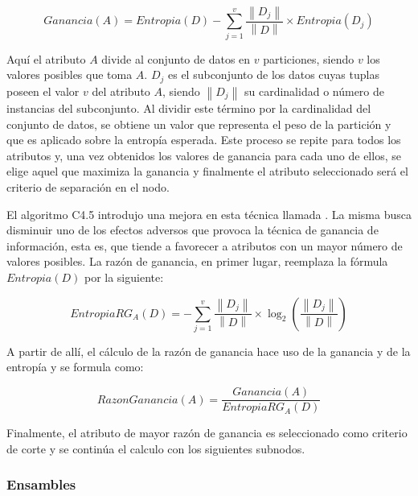 \begin{equation}
   Ganancia(A) = Entropia(D) 
   - \sum_{j=1}^{v} \frac{\left\| D_{j} \right\|}{\left\| D \right\|} 
   \times Entropia(D_{j})
\end{equation}

Aquí el atributo $A$ divide al conjunto de datos en $v$ particiones, siendo $v$
los valores posibles que toma $A$. $D_{j}$ es el subconjunto de los datos cuyas
tuplas poseen el valor $v$ del atributo $A$, siendo $\left\|D_{j}\right\|$ su
cardinalidad o número de instancias del subconjunto. Al dividir este término por
la cardinalidad del conjunto de datos, se obtiene un valor que representa el
peso de la partición y que es aplicado sobre la entropía esperada. Este proceso
se repite para todos los atributos y, una vez obtenidos los valores de ganancia
para cada uno de ellos, se elige aquel que maximiza la ganancia y finalmente el
atributo seleccionado será el criterio de separación en el nodo.

El algoritmo C4.5 introdujo una mejora en esta técnica llamada . La misma busca disminuir uno de los efectos adversos que provoca
la técnica de ganancia de información, esta es, que tiende a favorecer a
atributos con un mayor número de valores posibles. La razón de ganancia, en
primer lugar, reemplaza la fórmula $Entropia(D)$ por la siguiente:

\begin{equation}
   EntropiaRG_{A}(D) = - \sum_{j=1}^{v} \frac{\left\| D_{j} \right\|}{\left\| D \right\|} 
   \times \log_{2}(\frac{\left\| D_{j} \right\|}{\left\| D \right\|})
\end{equation}

A partir de allí, el cálculo de la razón de ganancia hace uso de la ganancia y
de la entropía y se formula como:

\begin{equation} \label{eq:gan_c45}
   RazonGanancia(A) = \frac{Ganancia(A)}{EntropiaRG_{A}(D)} 
\end{equation}

Finalmente, el atributo de mayor razón de ganancia es seleccionado como criterio
de corte y se continúa el calculo con los siguientes subnodos.


\subsubsection{Ensambles} 

